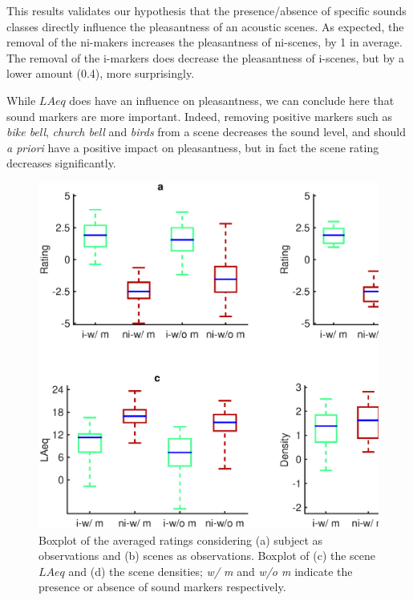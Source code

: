 \documentclass[twoside,twocolumn]{article}
\begin{document}
This results validates our hypothesis that the presence/absence of specific sounds classes directly influence the pleasantness of an acoustic scenes. As expected, the removal of the ni-makers increases the pleasantness of ni-scenes, by 1 in average. The removal of the i-markers does decrease the pleasantness of i-scenes, but by a lower amount (0.4), more surprisingly.

While $LAeq$ does have an influence on pleasantness, we can conclude here that sound markers are more important. Indeed, removing positive markers such as \textit{bike bell}, \textit{church bell} and \textit{birds} from a scene decreases the sound level, and should \emph{a priori} have a positive impact on pleasantness, but in fact the scene rating decreases significantly.
 
\begin{figure}[t]
\begin{center}
\includegraphics[width=\columnwidth]{../gfxMatlab/xp4_3.eps}
\caption{\label{fig:xp4_3} Boxplot of the averaged ratings considering (a) subject as observations and (b) scenes as observations. Boxplot of (c) the scene $LAeq$ and (d) the scene densities; \textit{w/ m} and \textit{w/o m} indicate the presence or absence of sound markers respectively.}
\end{center}
\end{figure}
\end{document}

